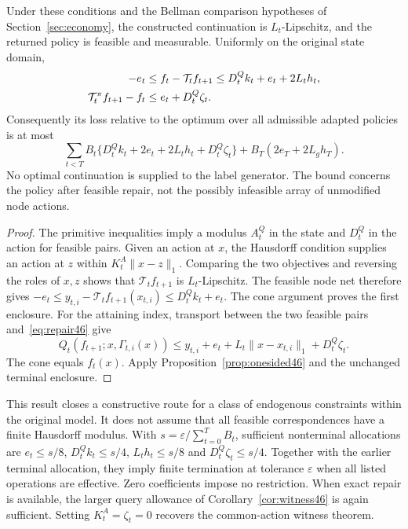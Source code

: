 \begin{theorem}\label{thm:feasible46}
Under these conditions and the Bellman comparison hypotheses of Section~\ref{sec:economy}, the constructed continuation is $L_t$-Lipschitz, and the returned policy is feasible and measurable. Uniformly on the original state domain,
\begin{align}\label{eq:graphres46}
 -e_t&\le f_t-\mathcal T_tf_{t+1}
       \le D_t^Qk_t+e_t+2L_th_t,\\
 \mathcal T_t^\pi f_{t+1}-f_t&\le e_t+D_t^Q\zeta_t.\notag
\end{align}
Consequently its loss relative to the optimum over all admissible adapted policies is at most
\begin{equation}\label{eq:graphgap46}
 \sum_{t<T}B_t\{D_t^Qk_t+2e_t+2L_th_t+D_t^Q\zeta_t\}
       +B_T(2e_T+2L_gh_T).
\end{equation}
No optimal continuation is supplied to the label generator. The bound concerns the policy after feasible repair, not the possibly infeasible array of unmodified node actions.
\end{theorem}
\begin{proof}
The primitive inequalities imply a modulus $A_t^Q$ in the state and $D_t^Q$ in the action for feasible pairs. Given an action at $x$, the Hausdorff condition supplies an action at $z$ within $K_t^A\|x-z\|_1$. Comparing the two objectives and reversing the roles of $x,z$ shows that $\mathcal T_tf_{t+1}$ is $L_t$-Lipschitz. The feasible node net therefore gives $-e_t\le y_{t,i}-\mathcal T_tf_{t+1}(x_{t,i})\le D_t^Qk_t+e_t$. The cone argument proves the first enclosure. For the attaining index, transport between the two feasible pairs and~\eqref{eq:repair46} give
\[
 Q_t(f_{t+1};x,\Gamma_{t,i}(x))
 \le y_{t,i}+e_t+L_t\|x-x_{t,i}\|_1+D_t^Q\zeta_t.
\]
The cone equals $f_t(x)$. Apply Proposition~\ref{prop:onesided46} and the unchanged terminal enclosure.
\end{proof}

This result closes a constructive route for a class of endogenous constraints within the original model. It does not assume that all feasible correspondences have a finite Hausdorff modulus. With $s=\varepsilon/\sum_{t=0}^TB_t$, sufficient nonterminal allocations are $e_t\le s/8$, $D_t^Qk_t\le s/4$, $L_th_t\le s/8$ and $D_t^Q\zeta_t\le s/4$. Together with the earlier terminal allocation, they imply finite termination at tolerance $\varepsilon$ when all listed operations are effective. Zero coefficients impose no restriction. When exact repair is available, the larger query allowance of Corollary~\ref{cor:witness46} is again sufficient. Setting $K_t^A=\zeta_t=0$ recovers the common-action witness theorem.

